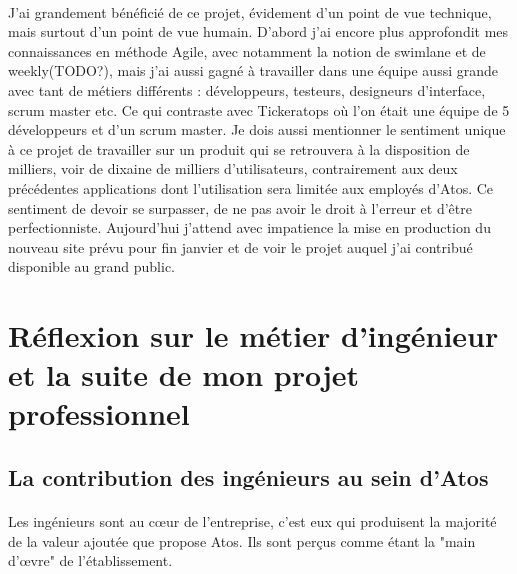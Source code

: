 \documentclass[12pt]{article}
\begin{document}
\begin {sloppypar}
\paragraph{}
J'ai grandement bénéficié de ce projet, évidement d'un point de vue technique, mais surtout d'un point 
de vue humain. D'abord j'ai encore plus approfondit mes connaissances en méthode Agile, avec notamment
la notion de swimlane et de weekly(TODO?), mais j'ai aussi gagné à travailler dans une équipe aussi grande avec 
tant de métiers différents : développeurs, testeurs, designeurs d'interface, scrum master etc. Ce qui contraste
avec Tickeratops où l'on était une équipe de 5 développeurs et d'un scrum master. Je dois aussi mentionner
le sentiment unique à ce projet de travailler sur un produit qui se retrouvera à la disposition de milliers,
voir de dixaine de milliers d'utilisateurs, contrairement aux deux précédentes applications dont l'utilisation
sera limitée aux employés d'Atos. Ce sentiment de devoir se surpasser, de ne pas avoir le droit à l'erreur 
et d'être perfectionniste. Aujourd'hui j'attend avec impatience la mise en production du nouveau site 
prévu pour fin janvier et de voir le projet auquel j'ai contribué disponible au grand public.

\newpage
\section{Réflexion sur le métier d'ingénieur et la suite de mon projet professionnel}
\subsection{La contribution des ingénieurs au sein d'Atos}
\paragraph{}
Les ingénieurs sont au cœur de l'entreprise, c'est eux qui produisent la majorité de la valeur 
ajoutée que propose Atos. Ils sont perçus comme étant la "main d'œvre" de l'établissement.

\end{sloppypar}
\end{document}
